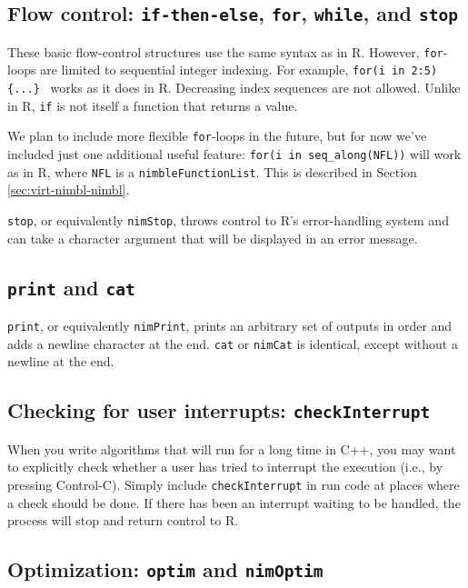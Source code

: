 \documentclass[12pt,oneside]{book}\usepackage[]{graphicx}\usepackage[]{color}
\def\cd#1{\texttt{#1}}
\begin{document}
\subsection{Flow control: \cd{if-then-else}, \cd{for},  \cd{while}, and \cd{stop}}
\label{sec:basic-flow-control}

These basic flow-control structures use the same syntax as in R.
However, \cd{for}-loops are limited to sequential integer
indexing.  For example, \cd{for(i in 2:5) \{...\} } works as it does
in R.  Decreasing index sequences are not allowed.  Unlike in R,
\cd{if} is not itself a function that returns a value.

We plan to include more flexible \cd{for}-loops in the future, but for
now we've included just one additional useful feature:  \cd{for(i in
  seq\_along(NFL))} will work as in R, where \cd{NFL} is a
\cd{nimbleFunctionList}.  This is described in Section \ref{sec:virt-nimbl-nimbl}.

\cd{stop}, or equivalently \cd{nimStop}, throws
control to R's error-handling system and can take a character
argument that will be displayed in an error message.

\subsection{\cd{print} and \cd{cat}}
\label{sec:print}

\cd{print}, or equivalently
\cd{nimPrint}, prints an arbitrary set of outputs in order and adds a
newline character at the end.  \cd{cat} or \cd{nimCat} is identical,
except without a newline at the end.  

\subsection{Checking for user interrupts: \cd{checkInterrupt}}
\label{sec:check-user-interr}

When you write algorithms that will run for a long time in C++, you
may want to explicitly check whether a user has tried to interrupt the
execution (i.e., by pressing Control-C).  Simply include
\cd{checkInterrupt} in run code at places where a check should
be done.  If there has been an
interrupt waiting to be handled, the process will stop and return control to R.

\subsection{Optimization: \cd{optim} and \cd{nimOptim}}
\end{document}
